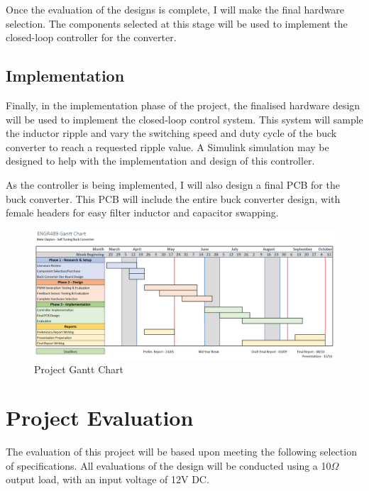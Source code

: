 \documentclass[11pt, a4paper, twoside, openright]{report}
\begin{document}
Once the evaluation of the designs is complete, I will make the final hardware selection. The components selected at this stage will be used to implement the closed-loop controller for the converter.

\subsection{Implementation}

Finally, in the implementation phase of the project, the finalised hardware design will be used to implement the closed-loop control system. This system will sample the inductor ripple and vary the switching speed and duty cycle of the buck converter to reach a requested ripple value. A Simulink simulation may be designed to help with the implementation and design of this controller.

As the controller is being implemented, I will also design a final PCB for the buck converter. This PCB will include the entire buck converter design, with female headers for easy filter inductor and capacitor swapping.

\begin{figure}[!h]
	\begin{center}
		\includegraphics[width = \linewidth]{gantt.png}
		\caption{Project Gantt Chart}
		\label{fig:gantt}
	\end{center}
\end{figure}

\newpage
\section{Project Evaluation}

The evaluation of this project will be based upon meeting the following selection of specifications. All evaluations of the design will be conducted using a 10$\Omega$ output load, with an input voltage of 12V DC.
\end{document}
